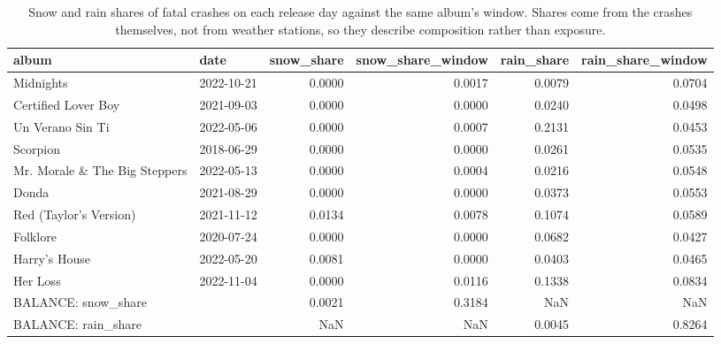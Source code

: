 \begin{table}
\caption{Snow and rain shares of fatal crashes on each release day against the same album's window. Shares come from the crashes themselves, not from weather stations, so they describe composition rather than exposure.}
\begin{tabular}{llrrrr}
\toprule
album & date & snow\_share & snow\_share\_window & rain\_share & rain\_share\_window \\
\midrule
Midnights & 2022-10-21 & 0.0000 & 0.0017 & 0.0079 & 0.0704 \\
Certified Lover Boy & 2021-09-03 & 0.0000 & 0.0000 & 0.0240 & 0.0498 \\
Un Verano Sin Ti & 2022-05-06 & 0.0000 & 0.0007 & 0.2131 & 0.0453 \\
Scorpion & 2018-06-29 & 0.0000 & 0.0000 & 0.0261 & 0.0535 \\
Mr. Morale \& The Big Steppers & 2022-05-13 & 0.0000 & 0.0004 & 0.0216 & 0.0548 \\
Donda & 2021-08-29 & 0.0000 & 0.0000 & 0.0373 & 0.0553 \\
Red (Taylor's Version) & 2021-11-12 & 0.0134 & 0.0078 & 0.1074 & 0.0589 \\
Folklore & 2020-07-24 & 0.0000 & 0.0000 & 0.0682 & 0.0427 \\
Harry's House & 2022-05-20 & 0.0081 & 0.0000 & 0.0403 & 0.0465 \\
Her Loss & 2022-11-04 & 0.0000 & 0.0116 & 0.1338 & 0.0834 \\
BALANCE: snow\_share &  & 0.0021 & 0.3184 & NaN & NaN \\
BALANCE: rain\_share &  & NaN & NaN & 0.0045 & 0.8264 \\
\bottomrule
\end{tabular}
\end{table}
